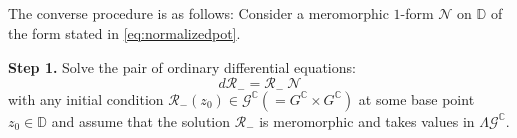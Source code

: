 \documentclass[12pt]{amsart}
\theoremstyle{definition}
\theoremstyle{remark}
\numberwithin{equation}{section}
\begin{document}
\subsection{}
 The converse procedure is as follows:
 Consider a meromorphic $1$-form ${\mathcal N}$ on ${\mathbb D}$ of the form stated  
 in \eqref{eq:normalizedpot}.

 {\bfseries Step 1.} Solve the pair of ordinary differential equations:
\begin{equation*}
 d {\mathcal R}_{-} = {\mathcal R}_{-}\> {\mathcal N}
\end{equation*}
 with any initial condition ${\mathcal R}_{-}(z_0) \in {\mathcal G}^{\mathbb C} (= G^{\mathbb C} \times G^{\mathbb C})$
 at some base point $z_0 \in {\mathbb D}$  and assume that the solution 
 ${\mathcal R}_{-}$  is  meromorphic and takes values in ${\Lambda {\mathcal G}^{\mathbb C}}$. 
\end{document}
